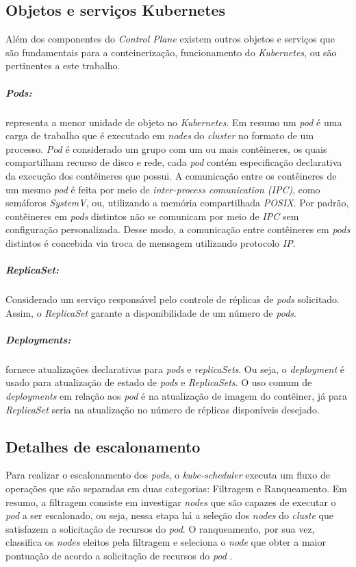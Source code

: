 \newpage
\subsection{Objetos e serviços Kubernetes}
Além dos componentes do \textit{Control Plane} existem outros objetos e serviços que são fundamentais para a conteinerização, funcionamento do \textit{Kubernetes}, ou são pertinentes a este trabalho. 

\subparagraph{\textit{Pods}:} representa a menor unidade de objeto no \textit{Kubernetes}. Em resumo um \textit{pod} é uma carga de trabalho que é executado em \textit{nodes} do \textit{cluster} no formato de um processo.
\textit{Pod} é considerado um grupo com um ou mais contêineres, os quais compartilham recurso de disco e rede, cada \textit{pod} contém especificação declarativa da execução dos contêineres que possui. A comunicação entre os contêineres de um mesmo \textit{pod} é feita por meio de \textit{inter-process comunication (IPC)}, como semáforos \textit{SystemV}, ou, utilizando a memória compartilhada \textit{POSIX}. Por padrão, contêineres em \textit{pods} distintos não se comunicam por meio de \textit{IPC} sem configuração personalizada. Desse modo, a comunicação entre contêineres em \textit{pods} distintos é concebida via troca de mensagem utilizando protocolo \textit{IP}.
	
\subparagraph{\textit{ReplicaSet}:}
Considerado um serviço responsável pelo controle de réplicas de \textit{pods} solicitado. Assim, o \textit{ReplicaSet} garante a disponibilidade de um número de \textit{pods}.
	
\subparagraph{\textit{Deployments}:}
fornece atualizações declarativas para \textit{pods} e \textit{replicaSets}. Ou seja, o \textit{deployment} é usado para atualização de estado de \textit{pods} e \textit{ReplicaSets}. O uso comum de \textit{deployments} em relação aos \textit{pod} é na atualização de imagem do contêiner, já para \textit{ReplicaSet} seria na atualização no número de réplicas disponíveis desejado.

\subsection{Detalhes de escalonamento}
Para realizar o escalonamento dos \textit{pods}, o \textit{kube-scheduler} executa um fluxo de operações que são separadas em duas categorias: Filtragem e Ranqueamento. Em resumo, a filtragem consiste em investigar \textit{nodes} que são capazes de executar o \textit{pod} a ser escalonado, ou seja, nessa etapa há a seleção dos \textit{nodes} do \textit{cluste} que satisfazem a solicitação de recursos do \textit{pod}. O ranqueamento, por sua vez, classifica os \textit{nodes} eleitos pela filtragem e seleciona o \textit{node} que obter a maior pontuação de acordo a solicitação de recursos do \textit{pod} \cite{Kubescheduler}.


